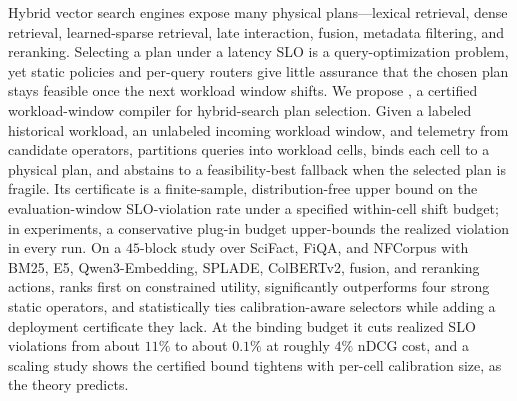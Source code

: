 Hybrid vector search engines expose many physical plans---lexical retrieval, dense retrieval, learned-sparse retrieval, late interaction, fusion, metadata filtering, and reranking. Selecting a plan under a latency SLO is a query-optimization problem, yet static policies and per-query routers give little assurance that the chosen plan stays feasible once the next workload window shifts. We propose \CWC{}, a certified workload-window compiler for hybrid-search plan selection. Given a labeled historical workload, an unlabeled incoming workload window, and telemetry from candidate operators, \CWC{} partitions queries into workload cells, binds each cell to a physical plan, and abstains to a feasibility-best fallback when the selected plan is fragile. Its certificate is a finite-sample, distribution-free upper bound on the evaluation-window SLO-violation rate under a specified within-cell shift budget; in experiments, a conservative plug-in budget upper-bounds the realized violation in every run. On a $45$-block study over SciFact, FiQA, and NFCorpus with BM25, E5, Qwen3-Embedding, SPLADE, ColBERTv2, fusion, and reranking actions, \CWC{} ranks first on constrained utility, significantly outperforms four strong static operators, and statistically ties calibration-aware selectors while adding a deployment certificate they lack. At the binding budget it cuts realized SLO violations from about $11\%$ to about $0.1\%$ at roughly $4\%$ nDCG cost, and a scaling study shows the certified bound tightens with per-cell calibration size, as the theory predicts.
